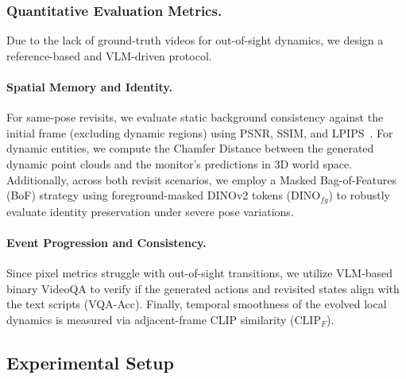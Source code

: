 \vspace{-1mm}
\subsubsection{Quantitative Evaluation Metrics.}
Due to the lack of ground-truth videos for out-of-sight dynamics, we design a reference-based and VLM-driven protocol.

\vspace{-1mm}
\paragraph{Spatial Memory and Identity.}
For same-pose revisits, we evaluate static background consistency against the initial frame (excluding dynamic regions) using PSNR, SSIM, and LPIPS~\cite{zhang2018lpips}. For dynamic entities, we compute the Chamfer Distance between the generated dynamic point clouds and the monitor's predictions in 3D world space. Additionally, across both revisit scenarios, we employ a Masked Bag-of-Features (BoF) strategy using foreground-masked DINOv2 tokens ($\text{DINO}_{fg}$) to robustly evaluate identity preservation under severe pose variations.
\vspace{-1mm}
\paragraph{Event Progression and Consistency.}
Since pixel metrics struggle with out-of-sight transitions, we utilize VLM-based binary VideoQA to verify if the generated actions and revisited states align with the text scripts (VQA-Acc). Finally, temporal smoothness of the evolved local dynamics is measured via adjacent-frame CLIP similarity ($\text{CLIP}_{F}$).






\subsection{Experimental Setup}


